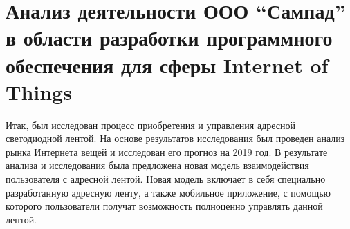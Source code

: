 \section{Анализ деятельности ООО \enquote{Сампад} в области разработки программного обеспечения для сферы Internet of Things}
\label{sec:analysis}



% 





Итак, был исследован процесс приобретения и управления адресной светодиодной лентой. На основе результатов исследования был проведен анализ рынка Интернета вещей и исследован его прогноз на 2019 год. В результате анализа и исследования была предложена новая модель взаимодействия пользователя с адресной лентой. Новая модель включает в себя специально разработанную адресную ленту, а также мобильное приложение, с помощью которого пользователи получат возможность полноценно управлять данной лентой.
